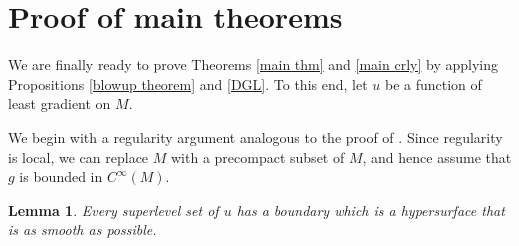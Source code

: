 \documentclass[reqno,12pt,letterpaper]{amsart}
\newtheorem{lemma}[theorem]{Lemma}
\theoremstyle{definition}
\numberwithin{equation}{section}
\begin{document}
\section{Proof of main theorems}\label{proof of main thm}
We are finally ready to prove Theorems \ref{main thm} and \ref{main crly} by applying Propositions \ref{blowup theorem} and \ref{DGL}.
To this end, let $u$ be a function of least gradient on $M$.

We begin with a regularity argument analogous to the proof of \cite[Teorema 4]{Miranda67}.
Since regularity is local, we can replace $M$ with a precompact subset of $M$, and hence assume that $g$ is bounded in $C^\infty(M)$.

\begin{lemma}
Every superlevel set of $u$ has a boundary which is a hypersurface that is as smooth as possible.
\end{lemma}
\end{document}
